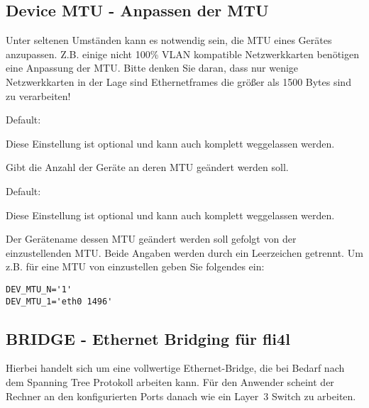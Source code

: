
{
\subsection {Device MTU - Anpassen der MTU}
}

Unter seltenen Umständen kann es notwendig sein, die MTU eines Gerätes
anzupassen. Z.B. einige nicht 100\% VLAN kompatible Netzwerkkarten
benötigen eine Anpassung der MTU. Bitte denken Sie daran, dass nur
wenige Netzwerkkarten in der Lage sind Ethernetframes die größer als
1500 Bytes sind zu verarbeiten!

\begin{description}


  Default: 

  Diese Einstellung ist optional und kann auch komplett weggelassen
  werden.

  Gibt die Anzahl der Geräte an deren MTU geändert werden soll.


  Default: 

  Diese Einstellung ist optional und kann auch komplett weggelassen
  werden.

  Der Gerätename dessen MTU geändert werden soll gefolgt von der
  einzustellenden MTU. Beide Angaben werden durch ein Leerzeichen
  getrennt. Um z.B. für  eine MTU von 
  einzustellen geben Sie folgendes ein:

\begin{example}
\begin{verbatim}
DEV_MTU_N='1'
DEV_MTU_1='eth0 1496'
\end{verbatim}
\end{example}

\end{description}

{
\subsection {BRIDGE - Ethernet Bridging für fli4l}
}

Hierbei handelt sich um eine vollwertige Ethernet-Bridge, die bei
Bedarf nach dem Spanning Tree Protokoll arbeiten kann. Für den
Anwender scheint der Rechner an den konfigurierten Ports danach wie
ein Layer~3 Switch zu arbeiten.

